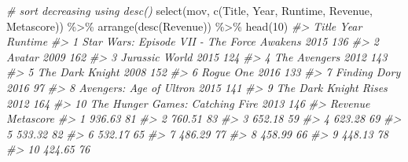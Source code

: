 \documentclass[
]{book}
\newenvironment{Shaded}{\begin{snugshade}}{\end{snugshade}}
\newcommand{\CommentTok}[1]{\textcolor[rgb]{0.56,0.35,0.01}{\textit{#1}}}
\newcommand{\DecValTok}[1]{\textcolor[rgb]{0.00,0.00,0.81}{#1}}
\newcommand{\FunctionTok}[1]{\textcolor[rgb]{0.00,0.00,0.00}{#1}}
\newcommand{\NormalTok}[1]{#1}
\newcommand{\SpecialCharTok}[1]{\textcolor[rgb]{0.00,0.00,0.00}{#1}}
\begin{document}
\begin{Shaded}
\begin{Highlighting}[]
\CommentTok{\# sort decreasing using desc()}
\FunctionTok{select}\NormalTok{(mov, }\FunctionTok{c}\NormalTok{(Title, Year, Runtime, Revenue, Metascore)) }\SpecialCharTok{\%\textgreater{}\%}
  \FunctionTok{arrange}\NormalTok{(}\FunctionTok{desc}\NormalTok{(Revenue)) }\SpecialCharTok{\%\textgreater{}\%}
  \FunctionTok{head}\NormalTok{(}\DecValTok{10}\NormalTok{)}
\CommentTok{\#\textgreater{}                                         Title Year Runtime}
\CommentTok{\#\textgreater{} 1  Star Wars: Episode VII {-} The Force Awakens 2015     136}
\CommentTok{\#\textgreater{} 2                                      Avatar 2009     162}
\CommentTok{\#\textgreater{} 3                              Jurassic World 2015     124}
\CommentTok{\#\textgreater{} 4                                The Avengers 2012     143}
\CommentTok{\#\textgreater{} 5                             The Dark Knight 2008     152}
\CommentTok{\#\textgreater{} 6                                   Rogue One 2016     133}
\CommentTok{\#\textgreater{} 7                                Finding Dory 2016      97}
\CommentTok{\#\textgreater{} 8                     Avengers: Age of Ultron 2015     141}
\CommentTok{\#\textgreater{} 9                       The Dark Knight Rises 2012     164}
\CommentTok{\#\textgreater{} 10            The Hunger Games: Catching Fire 2013     146}
\CommentTok{\#\textgreater{}    Revenue Metascore}
\CommentTok{\#\textgreater{} 1   936.63        81}
\CommentTok{\#\textgreater{} 2   760.51        83}
\CommentTok{\#\textgreater{} 3   652.18        59}
\CommentTok{\#\textgreater{} 4   623.28        69}
\CommentTok{\#\textgreater{} 5   533.32        82}
\CommentTok{\#\textgreater{} 6   532.17        65}
\CommentTok{\#\textgreater{} 7   486.29        77}
\CommentTok{\#\textgreater{} 8   458.99        66}
\CommentTok{\#\textgreater{} 9   448.13        78}
\CommentTok{\#\textgreater{} 10  424.65        76}



\end{Highlighting}
\end{Shaded}
\end{document}
